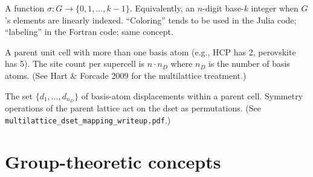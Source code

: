 \documentclass[11pt]{article}
\begin{document}
\begin{description}[leftmargin=2em, style=nextline]
\item[Labeling / coloring]
A function $\sigma : G \to \{0, 1, \ldots, k-1\}$. Equivalently, an
$n$-digit base-$k$ integer when $G$'s elements are linearly indexed.
``Coloring'' tends to be used in the Julia code; ``labeling'' in the
Fortran code; same concept.

\item[Multilattice]
A parent unit cell with more than one basis atom (e.g., HCP has 2,
perovskite has 5). The site count per supercell is $n \cdot n_D$ where
$n_D$ is the number of basis atoms.
(See Hart \& Forcade 2009 for the multilattice treatment.)

\item[dset (d-vector set)]
The set $\{d_1, \ldots, d_{n_D}\}$ of basis-atom displacements within a
parent cell. Symmetry operations of the parent lattice act on the dset
as permutations. (See \texttt{multilattice\_dset\_mapping\_writeup.pdf}.)
\end{description}

\section{Group-theoretic concepts}
\end{document}
